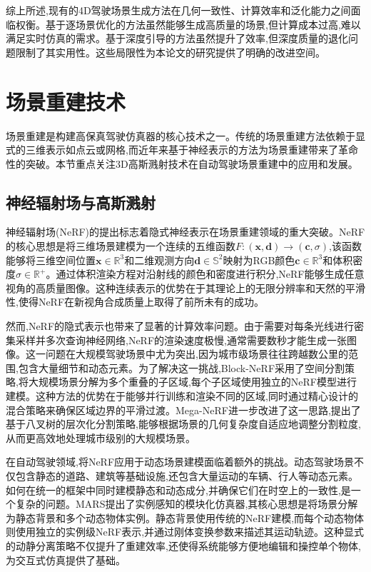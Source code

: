 综上所述,现有的4D驾驶场景生成方法在几何一致性、计算效率和泛化能力之间面临权衡。基于逐场景优化的方法虽然能够生成高质量的场景,但计算成本过高,难以满足实时仿真的需求。基于深度引导的方法虽然提升了效率,但深度质量的退化问题限制了其实用性。这些局限性为本论文的研究提供了明确的改进空间。

\section{场景重建技术}

场景重建是构建高保真驾驶仿真器的核心技术之一。传统的场景重建方法依赖于显式的三维表示如点云或网格,而近年来基于神经表示的方法为场景重建带来了革命性的突破。本节重点关注3D高斯溅射技术在自动驾驶场景重建中的应用和发展。

\subsection{神经辐射场与高斯溅射}

神经辐射场(NeRF)的提出标志着隐式神经表示在场景重建领域的重大突破\cite{mildenhall2021nerf}。NeRF的核心思想是将三维场景建模为一个连续的五维函数$F: (\mathbf{x}, \mathbf{d}) \rightarrow (\mathbf{c}, \sigma)$,该函数能够将三维空间位置$\mathbf{x} \in \mathbb{R}^3$和二维观测方向$\mathbf{d} \in \mathbb{S}^2$映射为RGB颜色$\mathbf{c} \in \mathbb{R}^3$和体积密度$\sigma \in \mathbb{R}^+$。通过体积渲染方程对沿射线的颜色和密度进行积分,NeRF能够生成任意视角的高质量图像。这种连续表示的优势在于其理论上的无限分辨率和天然的平滑性,使得NeRF在新视角合成质量上取得了前所未有的成功。

然而,NeRF的隐式表示也带来了显著的计算效率问题。由于需要对每条光线进行密集采样并多次查询神经网络,NeRF的渲染速度极慢,通常需要数秒才能生成一张图像。这一问题在大规模驾驶场景中尤为突出,因为城市级场景往往跨越数公里的范围,包含大量细节和动态元素。为了解决这一挑战,Block-NeRF采用了空间分割策略\cite{blocknerf2022},将大规模场景分解为多个重叠的子区域,每个子区域使用独立的NeRF模型进行建模。这种方法的优势在于能够并行训练和渲染不同的区域,同时通过精心设计的混合策略来确保区域边界的平滑过渡。Mega-NeRF\cite{meganeRF2022}进一步改进了这一思路,提出了基于八叉树的层次化分割策略,能够根据场景的几何复杂度自适应地调整分割粒度,从而更高效地处理城市级别的大规模场景。

在自动驾驶领域,将NeRF应用于动态场景建模面临着额外的挑战\cite{wu2023mars,yang2023emernerf}。动态驾驶场景不仅包含静态的道路、建筑等基础设施,还包含大量运动的车辆、行人等动态元素。如何在统一的框架中同时建模静态和动态成分,并确保它们在时空上的一致性,是一个复杂的问题。MARS\cite{wu2023mars}提出了实例感知的模块化仿真器,其核心思想是将场景分解为静态背景和多个动态物体实例。静态背景使用传统的NeRF建模,而每个动态物体则使用独立的实例级NeRF表示,并通过刚体变换参数来描述其运动轨迹。这种显式的动静分离策略不仅提升了重建效率,还使得系统能够方便地编辑和操控单个物体,为交互式仿真提供了基础。

